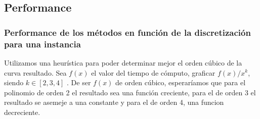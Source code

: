 \subsection{Performance}
\subsubsection{Performance de los m\'etodos en funci\'on de la discretizaci\'on para una instancia}
Utilizamos una heur\'istica para poder determinar mejor el orden c\'ubico de la curva resultado. Sea $f(x)$ el valor del tiempo de c\'omputo, graficar $f(x)/x^k$, siendo $k \in \left[ 2, 3, 4 \right] $ . De ser $f(x)$ de orden c\'ubico, esperar\'iamos que para el polinomio de orden 2 el resultado sea una funci\'on creciente, para el de orden 3 el resultado se asemeje a una constante y para el de orden 4, una funcion decreciente.

